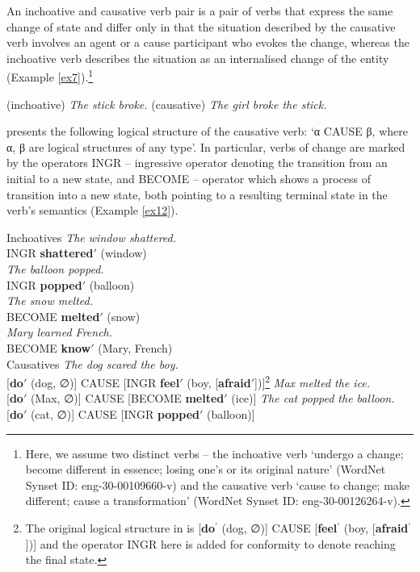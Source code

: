 \documentclass[output=paper,colorlinks,citecolor=brown]{langscibook}
\begin{document}
An inchoative and causative verb pair is a pair of verbs that express the same change of state and differ only in that the situation described by the causative verb involves an agent or a cause participant who evokes the change, whereas the inchoative verb describes the situation as an internalised change of the entity (Example \ref{ex7}).\footnote{Here, we assume two distinct verbs -- the inchoative verb  `undergo a change; become different in essence; losing one's or its original nature' (WordNet Synset ID: eng-30-00109660-v) and the causative verb  `cause to change; make different; cause a transformation' (WordNet Synset ID: eng-30-00126264-v).}

 \begin{exe}
 \ex \label{ex7}
     \begin{xlist}
         \ex \label{ex7a} (inchoative) \textit{The stick broke.}
         \ex \label{ex7b} (causative) \textit{The girl broke the stick.}
     \end{xlist}
\end{exe}


\citet[45]{VanValin2005} presents the following logical structure of the causative verb: `α CAUSE β, where α, β are logical structures of any type'. In particular, verbs of change are marked by the operators INGR -- ingressive operator denoting the transition from an initial to a new state, and BECOME -- operator which shows a process of transition into a new state, both pointing to a resulting terminal state in the verb’s semantics (Example \ref{ex12}).

\begin{exe}
\ex \label{ex12} Inchoatives
\ea \textit{The window shattered.} \\ 
     INGR \textbf{shattered$\prime$} (window)\\
\ex \textit{The balloon popped.}\\
    INGR \textbf{popped$\prime$} (balloon)\\
\ex \textit{The snow melted.}\\ 
    BECOME \textbf{melted$\prime$} (snow)\\
\ex \textit{Mary learned French.}\\ 
    BECOME \textbf{know$\prime$} (Mary, French)\\
\z
\ex \label{ex12a} Causatives
\ea 
\textit{The dog scared the boy.}\\
{[}\textbf{do$\prime$} (dog, ∅){]} CAUSE [INGR \textbf{feel$\prime$} (boy, [\textbf{afraid$\prime$}])]\footnote{The original logical structure in \citet{VanValin2005} is  [\textbf{do$^\prime$} (dog, ∅)] CAUSE [\textbf{feel$^\prime$} (boy, [\textbf{afraid$^\prime$}])] and the operator INGR here is added for conformity to denote reaching the final state.}
\ex \textit{Max melted the ice.}\\
{[}\textbf{do$\prime$} (Max, ∅){]} CAUSE [BECOME \textbf{melted$\prime$} (ice)]
\ex \textit{The cat popped the balloon.}\\
{[}\textbf{do$\prime$} (cat, ∅){]} CAUSE [INGR \textbf{popped$\prime$} (balloon)]
\z
\end{exe}
\end{document}
